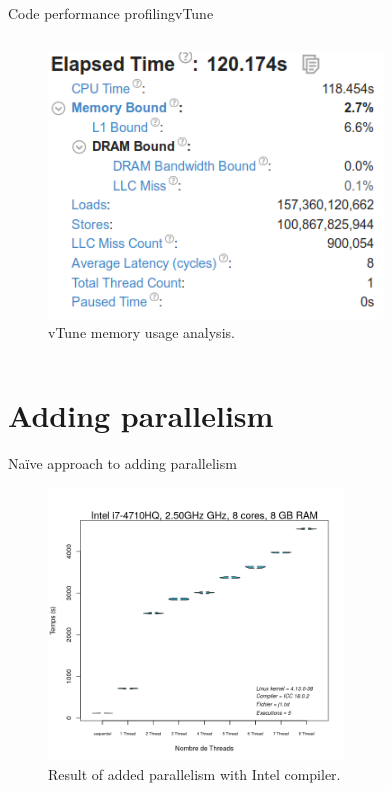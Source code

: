 \documentclass{beamer}
\begin{document}
\begin{frame}{Code performance profiling}{vTune}
\begin{columns}
\begin{figure}
   \includegraphics[width=0.9\textwidth]{memory_vtune.png}
   \caption{vTune memory usage analysis.\label{Fig:vTune_mem}}
    \end{figure}
    
  \end{columns}
\end{frame}

\section{Adding parallelism}

\begin{frame}{Naïve approach to adding parallelism}
	\begin{figure}
      \includegraphics[width=0.7\textwidth]{intel_parallel_naif.png}
      \caption{Result of added parallelism with Intel compiler.\label{Fig:naif_intel}}
  
	\end{figure}
\end{frame}
\end{document}
